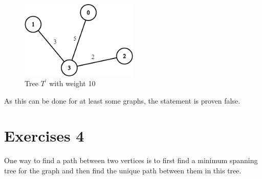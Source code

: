 \documentclass[nobib]{tufte-handout}
\begin{document}
\begin{figure}
    \centering
    \includegraphics[width=0.5\textwidth]{graphics/L6_prim_kruskal_dijkstra/distinctWeights3.png}
    \caption{Tree $T^\prime$ with weight 10}
\end{figure}

As this can be done for at least some graphs, the statement is proven false.
\newpage

\section{Exercises 4}

  One way to find a path between two vertices is to first find a minimum spanning tree for the graph and then find the unique path between them in this tree.  
\end{document}
